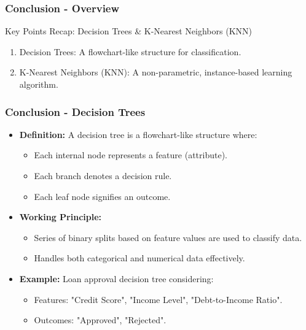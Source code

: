 \documentclass[aspectratio=169]{beamer}
\begin{document}
\begin{frame}[fragile]
    \frametitle{Conclusion - Overview}
    \begin{block}{Key Points Recap: Decision Trees \& K-Nearest Neighbors (KNN)}
        \begin{enumerate}
            \item Decision Trees: A flowchart-like structure for classification.
            \item K-Nearest Neighbors (KNN): A non-parametric, instance-based learning algorithm.
        \end{enumerate}
    \end{block}
\end{frame}

\begin{frame}[fragile]
    \frametitle{Conclusion - Decision Trees}
    \begin{itemize}
        \item \textbf{Definition:} A decision tree is a flowchart-like structure where:
        \begin{itemize}
            \item Each internal node represents a feature (attribute).
            \item Each branch denotes a decision rule.
            \item Each leaf node signifies an outcome.
        \end{itemize}
        
        \item \textbf{Working Principle:} 
        \begin{itemize}
            \item Series of binary splits based on feature values are used to classify data.
            \item Handles both categorical and numerical data effectively.
        \end{itemize}

        \item \textbf{Example:} Loan approval decision tree considering:
        \begin{itemize}
            \item Features: "Credit Score", "Income Level", "Debt-to-Income Ratio".
            \item Outcomes: "Approved", "Rejected".
        \end{itemize}
    \end{itemize}
\end{frame}
\end{document}
